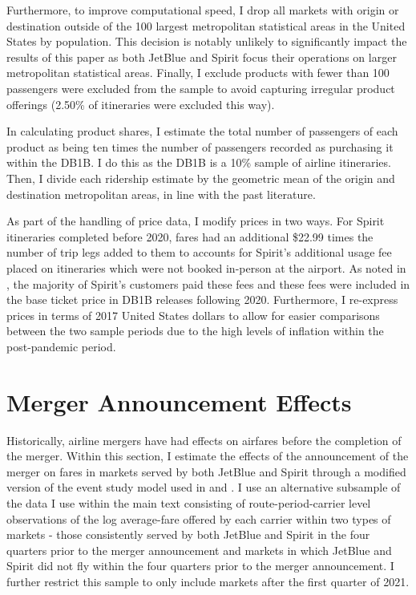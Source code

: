 \documentclass{article}
\begin{document}
\begin{appendices}
    Furthermore, to improve computational speed, I drop all markets with origin or destination outside of the 100 largest metropolitan statistical areas in the United States by population. This decision is notably unlikely to significantly impact the results of this paper as both JetBlue and Spirit focus their operations on larger metropolitan statistical areas. Finally, I exclude products with fewer than 100 passengers were excluded from the sample to avoid capturing irregular product offerings (2.50\% of itineraries were excluded this way). 
    	
	In calculating product shares, I estimate the total number of passengers of each product as being ten times the number of passengers recorded as purchasing it within the DB1B. I do this as the DB1B is a 10\% sample of airline itineraries. Then, I divide each ridership estimate by the geometric mean of the origin and destination metropolitan areas, in line with the past literature. 
	
	
	As part of the handling of price data, I modify prices in two ways. For Spirit itineraries completed before 2020, fares had an additional \$22.99 times the number of trip legs added to them to accounts for Spirit's additional usage fee placed on itineraries which were not booked in-person at the airport. As noted in \citet{shrago_spirit_2024}, the majority of Spirit's customers paid these fees and these fees were included in the base ticket price in DB1B releases following 2020. Furthermore, I re-express prices in terms of 2017 United States dollars to allow for easier comparisons between the two sample periods due to the high levels of inflation within the post-pandemic period.

    \FloatBarrier
    \section{Merger Announcement Effects}
    \setcounter{table}{0}
    \setcounter{figure}{0}

    Historically, airline mergers have had effects on airfares before the completion of the merger. Within this section, I estimate the effects of the announcement of the merger on fares in markets served by both JetBlue and Spirit through a modified version of the event study model used in \citet{goolsbee_how_2008} and \citet{fan_when_2020}. I use an alternative subsample of the data I use within the main text consisting of route-period-carrier level observations of the log average-fare offered by each carrier within two types of markets - those consistently served by both JetBlue and Spirit in the four quarters prior to the merger announcement and markets in which JetBlue and Spirit did not fly within the four quarters prior to the merger announcement. I further restrict this sample to only include markets after the first quarter of 2021. 
    

\end{appendices}
\end{document}
